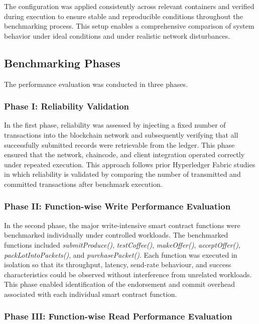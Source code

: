 \documentclass[12pt]{article}
\begin{document}
	The configuration was applied consistently across relevant containers and verified during execution to ensure stable and reproducible conditions throughout the benchmarking process. This setup enables a comprehensive comparison of system behavior under ideal conditions and under realistic network disturbances.
	
	\subsection{Benchmarking Phases}
	
	The performance evaluation was conducted in three phases.
	
	\subsubsection{Phase I: Reliability Validation}
	
	In the first phase, reliability was assessed by injecting a fixed number of transactions into the blockchain network and subsequently verifying that all successfully submitted records were retrievable from the ledger. This phase ensured that the network, chaincode, and client integration operated correctly under repeated execution. This approach follows prior Hyperledger Fabric studies in which reliability is validated by comparing the number of transmitted and committed transactions after benchmark execution. 
	
	\subsubsection{Phase II: Function-wise Write Performance Evaluation}
	
	In the second phase, the major write-intensive smart contract functions were benchmarked individually under controlled workloads. The benchmarked functions included \textit{submitProduce()}, \textit{testCoffee()}, \textit{makeOffer()}, \textit{acceptOffer()}, \textit{packLotIntoPackets()}, and \textit{purchasePacket()}. Each function was executed in isolation so that its throughput, latency, send-rate behaviour, and success characteristics could be observed without interference from unrelated workloads. This phase enabled identification of the endorsement and commit overhead associated with each individual smart contract function.
	
	\subsubsection{Phase III: Function-wise Read Performance Evaluation}
	
\end{document}
